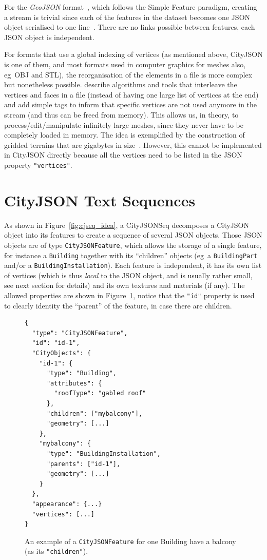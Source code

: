 \documentclass{isprs} %
\newcommand{\eg}{eg}
\begin{document}
%

For the \emph{GeoJSON} format~\citep{IETF-GeoJSON}, which follows the Simple Feature paradigm, creating a stream is trivial since each of the features in the dataset becomes one JSON object serialised to one line~\citep{IETF-GeoJSONSeq}.
There are no links possible between features, each JSON object is independent.

%

For formats that use a global indexing of vertices (as mentioned above, CityJSON is one of them, and  most formats used in computer graphics for meshes also, \eg\ OBJ and STL), the reorganisation of the elements in a file is more complex but nonetheless possible.
\citet{Isenburg03} describe algorithms and tools that interleave the vertices and faces in a file (instead of having one large list of vertices at the end) and add simple tags to inform that specific vertices are not used anymore in the stream (and thus can be freed from memory).
This allows us, in theory, to process/edit/manipulate infinitely large meshes, since they never have to be completely loaded in memory.
The idea is exemplified by the construction of gridded terrains that are gigabytes in size~\citep{Isenburg06-1}.
However, this cannot be implemented in CityJSON directly because all the vertices need to be listed in the JSON property \texttt{"vertices"}.


%
\section{CityJSON Text Sequences}%
\label{sec:cityjsonseq}


As shown in Figure~\ref{fig:cjseq_idea}, a CityJSONSeq decomposes a CityJSON object into its features to create a sequence of several JSON objects.
Those JSON objects are of type \texttt{CityJSONFeature}, which allows the storage of a single feature, for instance a \texttt{Building} together with its ``children'' objects (\eg\ a \texttt{BuildingPart} and/or a \texttt{BuildingInstallation}). 
Each feature is independent, it has its own list of vertices (which is thus \emph{local} to the JSON object, and is usually rather small, see next section for details) and its own textures and materials (if any).
The allowed properties are shown in Figure~\ref{fig:cjfeature}, notice that the \texttt{"id"} property is used to clearly identity the ``parent'' of the feature, in case there are children.
\begin{figure}
\begin{lstlisting}
{
  "type": "CityJSONFeature",
  "id": "id-1", 
  "CityObjects": {
    "id-1": {
      "type": "Building", 
      "attributes": { 
        "roofType": "gabled roof"
      },
      "children": ["mybalcony"],
      "geometry": [...]
    },
    "mybalcony": {
      "type": "BuildingInstallation", 
      "parents": ["id-1"],
      "geometry": [...]
    }
  },
  "appearance": {...}
  "vertices": [...]
}
\end{lstlisting}
\caption{An example of a \texttt{CityJSONFeature} for one Building have a balcony (as its \texttt{"children"}).}%
\label{fig:cjfeature}
\end{figure}
\end{document}
